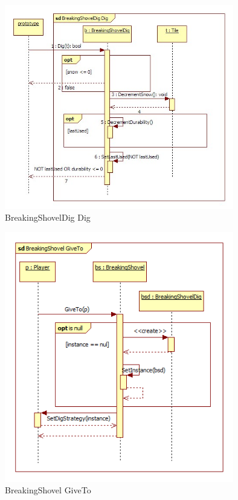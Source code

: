 \begin{figure}[H]
        \begin{center}
                \includegraphics[width=10cm]{chapters/chapter07/seqdiag/BreakingShovelDig_Dig.jpg}
                \caption{BreakingShovelDig Dig}
                \label{BreakingShovelDig Dig}
        \end{center}
\end{figure}
\begin{figure}[H]
        \begin{center}
                \includegraphics[width=10cm]{chapters/chapter07/seqdiag/BreakingShovel_GiveTo.png}
                \caption{BreakingShovel GiveTo}
                \label{BreakingShovel GiveTo}
        \end{center}
\end{figure}

